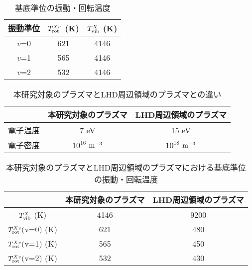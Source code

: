 \begin{table}
    \caption{基底準位の振動・回転温度}
    \label{table:fitting-result}
    \centering
    \begin{tabular}{ccc}
        \hline
        振動準位 & $T^{Xv}_{\rm rot}$ (K) & $T^{X}_{\rm vib}$ (K)\\
        \hline
        $v$=0 & 621 & 4146\\
        $v$=1 & 565 & 4146\\
        $v$=2 & 532 & 4146\\
        \hline
    \end{tabular}
\end{table}

\begin{table}
    \caption{本研究対象のプラズマとLHD周辺領域のプラズマ\cite{ishihara}との違い}
    \label{table:LHD-and-this-plasma}
    \centering
    \begin{tabular}{ccc}
        \hline
         & 本研究対象のプラズマ & LHD周辺領域のプラズマ\\
        \hline
        電子温度 & 7 eV & 15 eV\\
        電子密度 & $10^{16}$ $\rm m^{-3}$ & $10^{18}$ $\rm m^{-3}$\\
        \hline
    \end{tabular}
\end{table}

\begin{table}
    \caption{本研究対象のプラズマとLHD周辺領域のプラズマ\cite{ishihara}における基底準位の振動・回転温度}
    \label{table:ground-result-compare}
    \centering
    \begin{tabular}{ccc}
        \hline
        & 本研究対象のプラズマ & LHD周辺領域のプラズマ\\
        \hline
        $T^X_{\rm vib}$ (K)& 4146 & 9200\\
        $T^{Xv}_{\rm rot}($v=0$)$ (K)& 621 & 480\\
        $T^{Xv}_{\rm rot}($v=1$)$ (K)& 565 & 450\\
        $T^{Xv}_{\rm rot}($v=2$)$ (K)& 532 & 430\\
        \hline
    \end{tabular}
\end{table}
